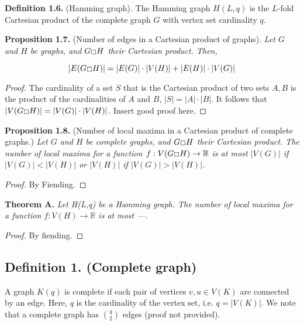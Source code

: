 \documentclass[10pt, reqno]{amsart}
\theoremstyle{plain}
\theoremstyle{definition}
\def\msquare{\mathord{\scalebox{0.35}[0.35]{\scalerel*{\Box}{\strut}}}}
\begin{document}
\textbf{Definition 1.6.} (Hamming graph). The Hamming graph $H(L, q)$ is the $L$-fold Cartesian product of the complete graph $G$ with vertex set cardinality $q$.\\

\clearpage



\textbf{Proposition 1.7.} (Number of edges in a Cartesian product of graphs). \textit{Let $G$ and $H$ be graphs, and $G \msquare H$ their Cartesian product. Then, }

$$|E(G \msquare H)| = |E(G)|\cdot |V(H)| + |E(H)|\cdot |V(G)|$$

\begin{proof}

The cardinality of a set $S$ that is the Cartesian product of two sets $A, B$ is the product of the cardinalities of $A$ and $B$, $|S| = |A|\cdot|B|$. It follows that $|V(G \msquare H)| = |V(G)|\cdot |V(H)|$. Insert good proof here. 
\end{proof}


\textbf{Proposition 1.8.} (Number of local maxima in a Cartesian product of complete graphs.) \textit{Let $G$ and $H$ be complete graphs, and $G \msquare H$ their Cartesian product. The number of local maxima for a function $f: V(G \msquare H) \to \mathbb{R}$ is at most $|V(G)|$ if $|V(G)| < |V(H)|$ or $|V(H)|$ if $|V(G)| > |V(H)|$.}

\begin{proof}
By Fiending. 
\end{proof}




\textbf{Theorem A.} \textit{Let H(L,q) be a Hamming graph. The number of local maxima for a function $f:V(H) \to \mathbb{R}$ is at most ---.}

\begin{proof}
By fiending.
\end{proof}


\clearpage














\subsection*{Definition 1. (Complete graph)} A graph $K(q)$ is complete if each pair of vertices $v,u \in V(K)$ are connected by an edge. Here, $q$ is the cardinality of the vertex set, i.e. $q = |V(K)|$. We note that a complete graph has ${q \choose 2}$ edges (proof not provided). 
\end{document}
